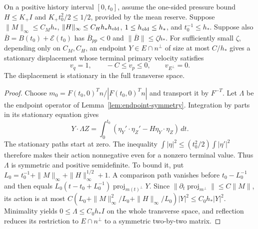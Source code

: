 \begin{lemma}\label{lem:actual-endpoint}
On a positive history interval $[0,t_0]$, assume the one-sided
pressure bound $H\leq K_+I$ and $K_+t_0^2/2\leq1/2$, provided by
the mean reserve. Suppose $\|M\|_\infty\leq C_Mh_*$,
$\|H\|_\infty\leq C_Hh_*h_{\rm old}$, $1\leq h_{\rm old}\leq h_*$,
and $t_0^{-1}\leq h_*$. Suppose also
$\overline B=B(t_0)+\mathcal E(t_0)$ has
$\overline B_{pp}<0$ and $\|\overline B\|\leq\zeta h_*$.
For sufficiently small $\zeta$, depending only on $C_M,C_H$, an endpoint
$Y\in E\cap n^\perp$ of size at most $C/h_*$ gives a stationary displacement
whose terminal primary velocity satisfies
\[
 v_q=1,\qquad -C\leq v_p\leq0,\qquad v_{E^\perp}=0.
\]
The displacement is stationary in the full transverse space.
\end{lemma}
\begin{proof}
Choose $m_0=F(t_0,0)^Tn/|F(t_0,0)^Tn|$ and transport it by $F^{-T}$.
Let $\Lambda$ be the endpoint operator of Lemma~\ref{lem:endpoint-symmetry}.
Integration by parts in its stationary equation gives
\[
 Y\cdot\Lambda Z=\int_0^{t_0}
    (\eta_Y'\cdot\eta_Z'-H\eta_Y\cdot\eta_Z)\,dt.
\]
The stationary paths start at zero. The inequality
$\int|\eta|^2\leq(t_0^2/2)\int|\eta'|^2$ therefore makes their
action nonnegative even for a nonzero terminal value. Thus $\Lambda$
is symmetric and positive semidefinite. To bound it, put
$L_0=t_0^{-1}+\|M\|_\infty+\|H\|_\infty^{1/2}+1$.
A comparison path vanishes before $t_0-L_0^{-1}$ and then equals
$L_0(t-t_0+L_0^{-1})\operatorname{proj}_{m(t)^\perp}Y$.
Since $\|\partial_t\operatorname{proj}_{m^\perp}\|\leq C\|M\|$,
its action is at most
$C(L_0+\|M\|_\infty^2/L_0+\|H\|_\infty/L_0)|Y|^2
\leq C_0h_*|Y|^2$.
Minimality yields $0\leq\Lambda\leq C_0h_*I$ on the whole transverse
space, and reflection reduces its restriction to $E\cap n^\perp$ to a
symmetric two-by-two matrix.


\end{proof}

